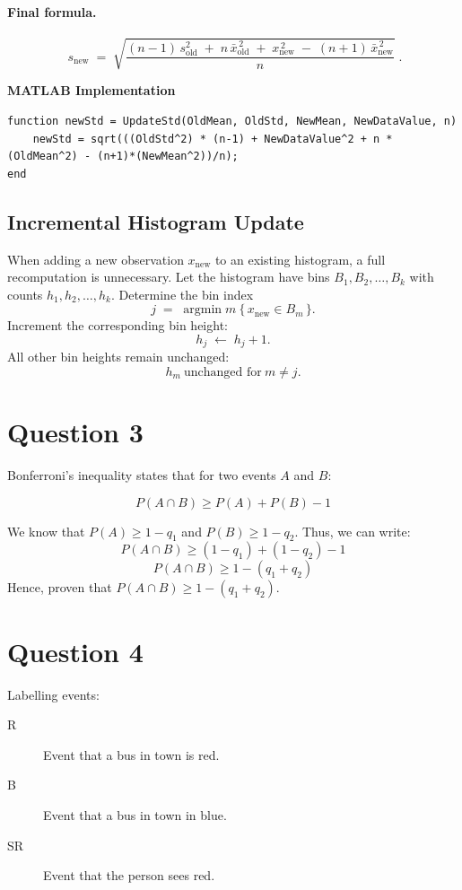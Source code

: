 \documentclass{report}
\begin{document}
\paragraph{Final formula.}
\[
\boxed{\;
s_{\text{new}}
\;=\;
\sqrt{\frac{(n-1)\,s_{\text{old}}^2 \;+\; n\,\bar{x}_{\text{old}}^{\,2} \;+\; x_{\text{new}}^{\,2} \;-\; (n+1)\,\bar{x}_{\text{new}}^{\,2}}{n}}
\; }.
\]

\noindent\textbf{MATLAB Implementation}
\begin{verbatim}
function newStd = UpdateStd(OldMean, OldStd, NewMean, NewDataValue, n)
    newStd = sqrt(((OldStd^2) * (n-1) + NewDataValue^2 + n * (OldMean^2) - (n+1)*(NewMean^2))/n);
end
\end{verbatim}

\subsection{Incremental Histogram Update}

When adding a new observation $x_{\text{new}}$ to an existing histogram, a full recomputation is unnecessary.  
Let the histogram have bins $B_1, B_2, \dots, B_k$ with counts $h_1, h_2, \dots, h_k$.  
Determine the bin index
\[
j \;=\; \operatorname{argmin}{m} \ \{\, x_{\text{new}} \in B_m \,\}.
\]
Increment the corresponding bin height:
\[
h_j \;\leftarrow\; h_j + 1.
\]
All other bin heights remain unchanged:
\[
h_m \ \text{unchanged for} \ m \neq j.
\]

\section*{Question 3}
Bonferroni's inequality states that for two events \( A \) and \( B \):

\[P(A \cap B) \geq P(A) + P(B) - 1 \]

We know that \( P(A) \geq 1 - q_1 \) and \( P(B) \geq 1 - q_2\).
Thus, we can write:
\[P(A \cap B) \geq (1 - q_1) + (1 - q_2) - 1\]
\[P(A \cap B) \geq 1 - (q_1 + q_2)\]
Hence, proven that \( P(A \cap B) \geq 1 - (q_1 + q_2) \).

\section*{Question 4}

Labelling events: \\
 \begin{description}
\item[R]Event that a bus in town is red.
\item[B] Event that a bus in town in blue.
\item[SR] Event that the person sees red.
 \end{description}
\end{document}

